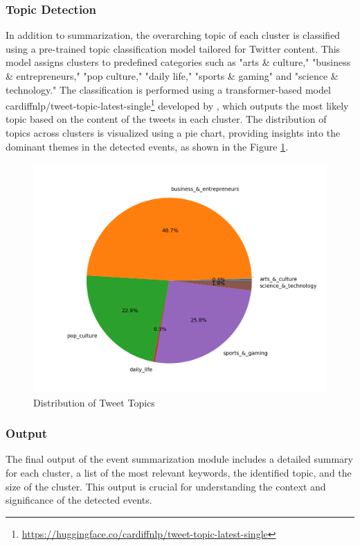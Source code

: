 \subsubsection{Topic Detection} In addition to summarization, the overarching topic of each cluster is classified using a pre-trained topic classification model tailored for Twitter content. This model assigns clusters to predefined categories such as "arts \& culture," "business \& entrepreneurs," "pop culture," "daily life," "sports \& gaming" and "science \& technology." The classification is performed using a transformer-based model cardiffnlp/tweet-topic-latest-single\footnote{\url{https://huggingface.co/cardiffnlp/tweet-topic-latest-single}} developed by \citet{twitter-topic-classification}, which outputs the most likely topic based on the content of the tweets in each cluster. The distribution of topics across clusters is visualized using a pie chart, providing insights into the dominant themes in the detected events, as shown in the Figure \ref{fig:pie_chart}.

\begin{figure}[htbp]
    \centering
    \includegraphics[width=1\linewidth]{Images/pie_chart.png}
    \caption{Distribution of Tweet Topics}
    \label{fig:pie_chart}
\end{figure}

\subsubsection{Output} The final output of the event summarization module includes a detailed summary for each cluster, a list of the most relevant keywords, the identified topic, and the size of the cluster. This output is crucial for understanding the context and significance of the detected events. 

